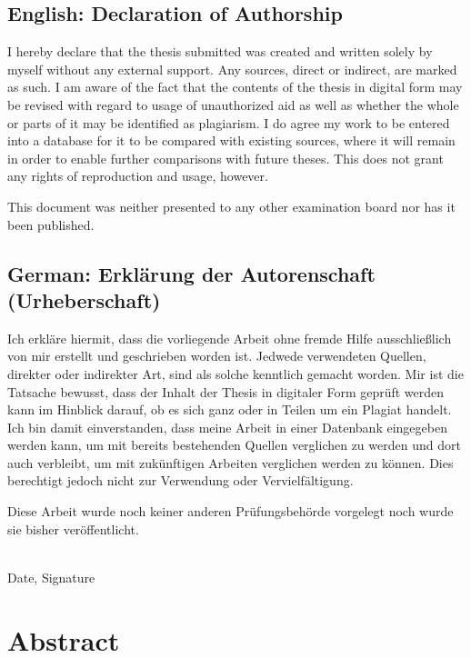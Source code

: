 \documentclass[]{article}
\begin{document}
	\subsection*{English: Declaration of Authorship}
	
	I hereby declare that the thesis submitted was created and written
	solely by myself without any external support. Any sources, direct
	or indirect, are marked as such. I am aware of the fact that the
	contents of the thesis in digital form may be revised with regard to
	usage of unauthorized aid as well as whether the whole or parts of
	it may be identified as plagiarism. I do agree my work to be entered
	into a database for it to be compared with existing sources, where
	it will remain in order to enable further comparisons with future
	theses. This does not grant any rights of reproduction and usage,
	however.
	
	This document was neither presented to any other examination board
	nor has it been published.
	
	\subsection*{German: Erklärung der Autorenschaft (Urheberschaft)}
	
	Ich erkläre hiermit, dass die vorliegende Arbeit ohne fremde Hilfe
	ausschließlich von mir erstellt und geschrieben worden ist. Jedwede
	verwendeten Quellen, direkter oder indirekter Art, sind als solche
	kenntlich gemacht worden. Mir ist die Tatsache bewusst, dass der
	Inhalt der Thesis in digitaler Form geprüft werden kann im Hinblick
	darauf, ob es sich ganz oder in Teilen um ein Plagiat handelt. Ich
	bin damit einverstanden, dass meine Arbeit in einer Datenbank
	eingegeben werden kann, um mit bereits bestehenden Quellen
	verglichen zu werden und dort auch verbleibt, um mit zukünftigen
	Arbeiten verglichen werden zu können. Dies berechtigt jedoch nicht
	zur Verwendung oder Vervielfältigung.
	
	Diese Arbeit wurde noch keiner anderen Prüfungsbehörde vorgelegt
	noch wurde sie bisher veröffentlicht.
	
	\vspace{20mm}
	
	\dotfill\\
	Date, Signature
	
	\newpage
	
	\section*{Abstract}
	
\end{document}
